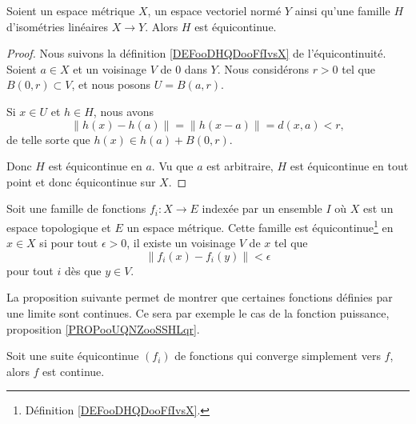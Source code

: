\begin{lemma}        \label{LEMooMIHJooUhvPgM}
	Soient un espace métrique \( X\), un espace vectoriel normé \( Y\) ainsi qu'une famille \( H\) d'isométries linéaires \( X\to Y\). Alors \( H\) est équicontinue.
\end{lemma}

\begin{proof}
	Nous suivons la définition \ref{DEFooDHQDooFfIvsX} de l'équicontinuité. Soient \( a\in X\) et un voisinage \( V\) de \( 0\) dans \( Y\). Nous considérons \( r>0\) tel que \( B(0,r)\subset V\), et nous posons \( U=B(a,r)\).

	Si \( x\in U\) et \( h\in H\), nous avons
	\begin{equation}
		\| h(x)-h(a) \|=\| h(x-a) \|=d(x,a)<r,
	\end{equation}
	de telle sorte que \( h(x)\in h(a)+B(0,r)\).

	Donc \( H\) est équicontinue en \( a\). Vu que \( a\) est arbitraire, \( H\) est équicontinue en tout point et donc équicontinue sur \( X\).
\end{proof}

\begin{lemma}           \label{LEMooKEMRooYyqsBl}
	Soit une famille de fonctions \( f_i\colon X\to E\) indexée par un ensemble \( I\) où \( X\) est un espace topologique et \( E\) un espace métrique. Cette famille est équicontinue\footnote{Définition \ref{DEFooDHQDooFfIvsX}.} en \( x\in X\) si pour tout \( \epsilon>0\), il existe un voisinage \( V\) de \( x\) tel que
	\begin{equation}
		\| f_i(x)-f_i(y) \|<\epsilon
	\end{equation}
	pour tout \( i\) dès que \( y\in V\).
\end{lemma}

La proposition suivante permet de montrer que certaines fonctions définies par une limite sont continues. Ce sera par exemple le cas de la fonction puissance, proposition \ref{PROPooUQNZooSSHLqr}.
\begin{proposition}     \label{PROPooICNNooAMjcut}
	Soit une suite équicontinue \( (f_i)\) de fonctions qui converge simplement vers \( f\), alors \( f\) est continue.
\end{proposition}

